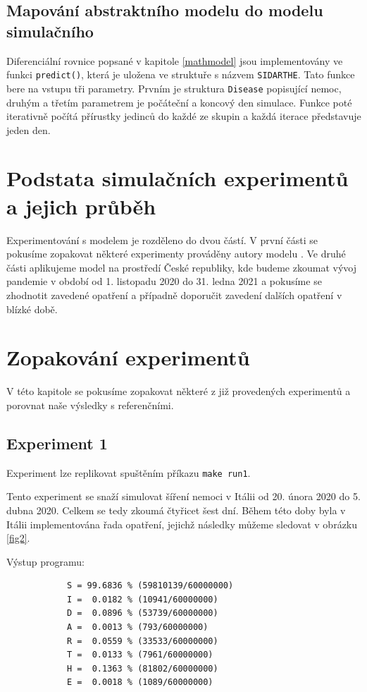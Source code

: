\documentclass[a4paper,11pt]{article}
\begin{document}
		\subsection{Mapování abstraktního modelu do modelu simulačního}
			Diferenciální rovnice popsané v kapitole \ref{mathmodel} jsou implementovány ve funkci \texttt{predict()}, která je uložena ve struktuře s názvem \texttt{SIDARTHE}. Tato funkce bere na vstupu tři parametry. Prvním je struktura \texttt{Disease} popisující nemoc, druhým a třetím parametrem je počáteční a koncový den simulace. Funkce poté iterativně počítá přírustky jedinců do každé ze skupin a každá iterace představuje jeden den.
			
	\section{Podstata simulačních experimentů a jejich průběh}
	\label{experiments}
		Experimentování s modelem je rozděleno do dvou částí. V první části se pokusíme zopakovat některé experimenty prováděny autory modelu \cite{source}. Ve druhé části aplikujeme model na prostředí České republiky, kde budeme zkoumat vývoj pandemie v období od 1. listopadu 2020 do 31. ledna 2021 a pokusíme se zhodnotit zavedené opatření a případně doporučit zavedení dalších opatření v blízké době.
		
	\section{Zopakování experimentů}
		V této kapitole se pokusíme zopakovat některé z již provedených experimentů a porovnat naše výsledky s referenčními.
	
		\subsection{Experiment 1}
		\label{e1}
			Experiment lze replikovat spuštěním příkazu \texttt{make run1}.
		
			Tento experiment se snaží simulovat šíření nemoci v Itálii od 20. února 2020 do 5. dubna 2020. Celkem se tedy zkoumá čtyřicet šest dní. Během této doby byla v Itálii implementována řada opatření, jejichž následky můžeme sledovat v obrázku \ref{fig2}.
			
			Výstup programu:
			\begin{verbatim}
			S = 99.6836 % (59810139/60000000)
			I =  0.0182 % (10941/60000000)
			D =  0.0896 % (53739/60000000)
			A =  0.0013 % (793/60000000)
			R =  0.0559 % (33533/60000000)
			T =  0.0133 % (7961/60000000)
			H =  0.1363 % (81802/60000000)
			E =  0.0018 % (1089/60000000)
			\end{verbatim}
			
\end{document}
